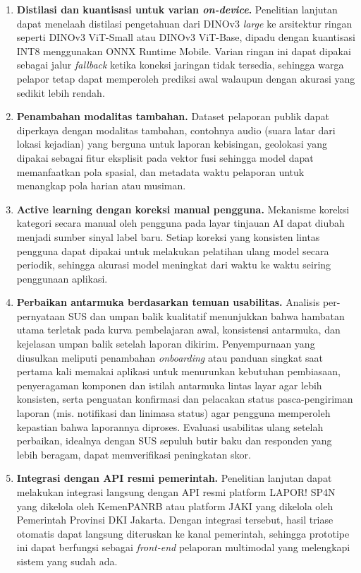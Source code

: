 \begin{enumerate}
    \item \textbf{Distilasi dan kuantisasi untuk varian \textit{on-device}.} Penelitian lanjutan dapat menelaah distilasi pengetahuan dari DINOv3 \textit{large} ke arsitektur ringan seperti DINOv3 ViT-Small atau DINOv3 ViT-Base, dipadu dengan kuantisasi INT8 menggunakan ONNX Runtime Mobile. Varian ringan ini dapat dipakai sebagai jalur \textit{fallback} ketika koneksi jaringan tidak tersedia, sehingga warga pelapor tetap dapat memperoleh prediksi awal walaupun dengan akurasi yang sedikit lebih rendah.

    \item \textbf{Penambahan modalitas tambahan.} Dataset pelaporan publik dapat diperkaya dengan modalitas tambahan, contohnya audio (suara latar dari lokasi kejadian) yang berguna untuk laporan kebisingan, geolokasi yang dipakai sebagai fitur eksplisit pada vektor fusi sehingga model dapat memanfaatkan pola spasial, dan metadata waktu pelaporan untuk menangkap pola harian atau musiman.

    \item \textbf{Active learning dengan koreksi manual pengguna.} Mekanisme koreksi kategori secara manual oleh pengguna pada layar tinjauan AI dapat diubah menjadi sumber sinyal label baru. Setiap koreksi yang konsisten lintas pengguna dapat dipakai untuk melakukan pelatihan ulang model secara periodik, sehingga akurasi model meningkat dari waktu ke waktu seiring penggunaan aplikasi.

    \item \textbf{Perbaikan antarmuka berdasarkan temuan usabilitas.} Analisis per-pernyataan SUS dan umpan balik kualitatif menunjukkan bahwa hambatan utama terletak pada kurva pembelajaran awal, konsistensi antarmuka, dan kejelasan umpan balik setelah laporan dikirim. Penyempurnaan yang diusulkan meliputi penambahan \textit{onboarding} atau panduan singkat saat pertama kali memakai aplikasi untuk menurunkan kebutuhan pembiasaan, penyeragaman komponen dan istilah antarmuka lintas layar agar lebih konsisten, serta penguatan konfirmasi dan pelacakan status pasca-pengiriman laporan (mis. notifikasi dan linimasa status) agar pengguna memperoleh kepastian bahwa laporannya diproses. Evaluasi usabilitas ulang setelah perbaikan, idealnya dengan SUS sepuluh butir baku dan responden yang lebih beragam, dapat memverifikasi peningkatan skor.

    \item \textbf{Integrasi dengan API resmi pemerintah.} Penelitian lanjutan dapat melakukan integrasi langsung dengan API resmi platform LAPOR! SP4N yang dikelola oleh KemenPANRB atau platform JAKI yang dikelola oleh Pemerintah Provinsi DKI Jakarta. Dengan integrasi tersebut, hasil triase otomatis dapat langsung diteruskan ke kanal pemerintah, sehingga prototipe ini dapat berfungsi sebagai \textit{front-end} pelaporan multimodal yang melengkapi sistem yang sudah ada.


\end{enumerate}
